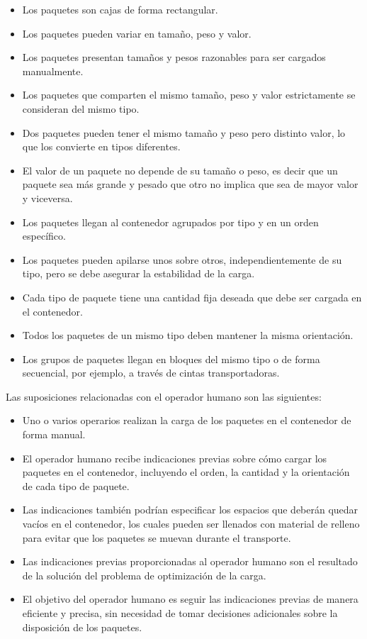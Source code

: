 \begin{itemize}
    \item Los paquetes son cajas de forma rectangular.
    \item Los paquetes pueden variar en tamaño, peso y valor.
    \item Los paquetes presentan tamaños y pesos razonables para ser cargados manualmente.
    \item Los paquetes que comparten el mismo tamaño, peso y valor estrictamente se consideran del mismo tipo.
    \item Dos paquetes pueden tener el mismo tamaño y peso pero distinto valor, lo que los convierte en tipos diferentes.
    \item El valor de un paquete no depende de su tamaño o peso, es decir que un paquete sea más grande y pesado que otro no implica que sea de mayor valor y viceversa.
    \item Los paquetes llegan al contenedor agrupados por tipo y en un orden específico.
    \item Los paquetes pueden apilarse unos sobre otros, independientemente de su tipo, pero se debe asegurar la estabilidad de la carga.
    \item Cada tipo de paquete tiene una cantidad fija deseada que debe ser cargada en el contenedor.
    \item Todos los paquetes de un mismo tipo deben mantener la misma orientación.
    \item Los grupos de paquetes llegan en bloques del mismo tipo o de forma secuencial, por ejemplo, a través de cintas transportadoras.
\end{itemize}

Las suposiciones relacionadas con el operador humano son las siguientes:

\begin{itemize}
    \item Uno o varios operarios realizan la carga de los paquetes en el contenedor de forma manual.
    \item El operador humano recibe indicaciones previas sobre cómo cargar los paquetes en el contenedor, incluyendo el orden, la cantidad y la orientación de cada tipo de paquete.
    \item Las indicaciones también podrían especificar los espacios que deberán quedar vacíos en el contenedor, los cuales pueden ser llenados con material de relleno para evitar que los paquetes se muevan durante el transporte.
    \item Las indicaciones previas proporcionadas al operador humano son el resultado de la solución del problema de optimización de la carga.
    \item El objetivo del operador humano es seguir las indicaciones previas de manera eficiente y precisa, sin necesidad de tomar decisiones adicionales sobre la disposición de los paquetes.
\end{itemize}

